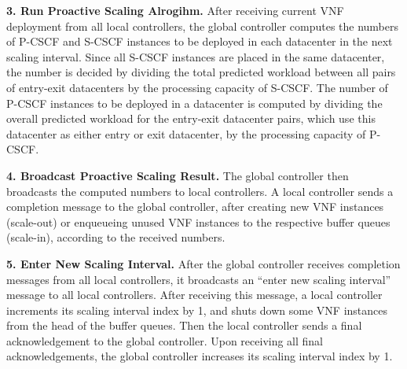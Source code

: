 \vspace{1mm}
\noindent\textbf{3. Run Proactive Scaling Alrogihm.} After receiving current VNF deployment from all local controllers, the global controller computes the numbers of P-CSCF and S-CSCF instances to be deployed in each datacenter in the next scaling interval. Since all S-CSCF instances are placed in the same datacenter, the number is decided by dividing the total predicted workload between all pairs of entry-exit datacenters by the processing capacity of S-CSCF. The number of P-CSCF instances to be deployed in a datacenter is computed by dividing the overall predicted workload for the entry-exit datacenter pairs, which use this datacenter as either entry or exit datacenter, by the processing capacity of P-CSCF.

\vspace{1mm}
\noindent\textbf{4. Broadcast Proactive Scaling Result.} The global controller then broadcasts the computed numbers to local controllers. A local controller sends a completion message to the global controller, after creating new VNF instances (scale-out) or enqueueing unused VNF instances to the respective buffer queues (scale-in), according to the received numbers.

\vspace{1mm}
\noindent\textbf{5. Enter New Scaling Interval.} After the global controller receives completion messages from all local controllers, it broadcasts an ``enter new scaling interval'' message to all local controllers. After receiving this message, a local controller increments its scaling interval index by 1, and shuts down some VNF instances from the head of the buffer queues. Then the local controller sends a final acknowledgement to the global controller. Upon receiving all final acknowledgements, %
 the global controller increases its scaling interval index by 1.

